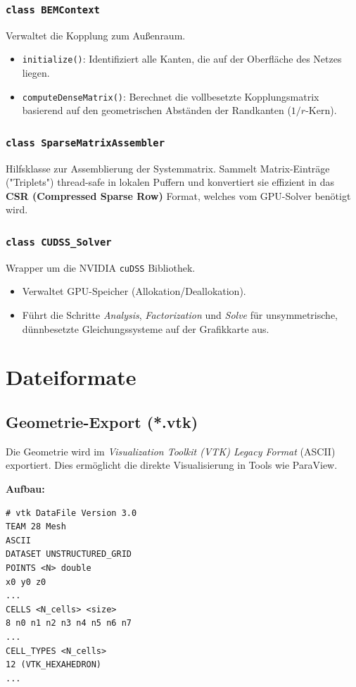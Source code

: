\documentclass[a4paper,12pt]{article}
\begin{document}
\subsubsection{\texttt{class BEMContext}}
Verwaltet die Kopplung zum Außenraum.
\begin{itemize}
    \item \texttt{initialize()}: Identifiziert alle Kanten, die auf der Oberfläche des Netzes liegen.
    \item \texttt{computeDenseMatrix()}: Berechnet die vollbesetzte Kopplungsmatrix basierend auf den geometrischen Abständen der Randkanten ($1/r$-Kern).
\end{itemize}

\subsubsection{\texttt{class SparseMatrixAssembler}}
Hilfsklasse zur Assemblierung der Systemmatrix. Sammelt Matrix-Einträge ("Triplets") thread-safe in lokalen Puffern und konvertiert sie effizient in das \textbf{CSR (Compressed Sparse Row)} Format, welches vom GPU-Solver benötigt wird.

\subsubsection{\texttt{class CUDSS\_Solver}}
Wrapper um die NVIDIA \texttt{cuDSS} Bibliothek.
\begin{itemize}
    \item Verwaltet GPU-Speicher (Allokation/Deallokation).
    \item Führt die Schritte \textit{Analysis}, \textit{Factorization} und \textit{Solve} für unsymmetrische, dünnbesetzte Gleichungssysteme auf der Grafikkarte aus.
\end{itemize}

\section{Dateiformate}

\subsection{Geometrie-Export (*.vtk)}
Die Geometrie wird im \textit{Visualization Toolkit (VTK) Legacy Format} (ASCII) exportiert. Dies ermöglicht die direkte Visualisierung in Tools wie ParaView.

\textbf{Aufbau:}
\begin{lstlisting}
# vtk DataFile Version 3.0
TEAM 28 Mesh
ASCII
DATASET UNSTRUCTURED_GRID
POINTS <N> double
x0 y0 z0
...
CELLS <N_cells> <size>
8 n0 n1 n2 n3 n4 n5 n6 n7
...
CELL_TYPES <N_cells>
12 (VTK_HEXAHEDRON)
...
\end{lstlisting}
\end{document}
